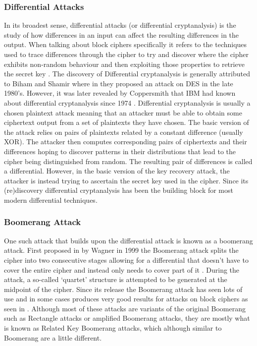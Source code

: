 \documentclass{article}
\begin{document}
\subsubsection{Differential Attacks}
In its broadest sense, differential attacks (or differential cryptanalysis) is the study of how differences in an input can affect the resulting differences in the output. When talking about block ciphers specifically it refers to the techniques used to trace differences through the cipher to try and discover where the cipher exhibits non-random behaviour and then exploiting those properties to retrieve the secret key \cite{wiki:Differential_cryptanalysis}. The discovery of Differential cryptanalysis is generally attributed to Biham and Shamir where in \cite{10.1007/3-540-38424-3_1} they proposed an attack on DES in the late 1980’s. However, it was later revealed by Coppersmith that IBM had known about differential cryptanalysis since 1974 \cite{5389567}. 
Differential cryptanalysis is usually a chosen plaintext attack meaning that an attacker must be able to obtain some ciphertext output from a set of plaintexts they have chosen. The basic version of the attack relies on pairs of plaintexts related by a constant difference (usually XOR). The attacker then computes corresponding pairs of ciphertexts and their differences hoping to discover patterns in their distributions that lead to the cipher being distinguished from random. The resulting pair of differences is called a differential. However, in the basic version of the key recovery attack, the attacker is instead trying to ascertain the secret key used in the cipher. Since its (re)discovery differential cryptanalysis has been the building block for most modern differential techniques.
\subsubsection{Boomerang Attack}
One such attack that builds upon the differential attack is known as a boomerang attack. First proposed in \cite{10.1007/3-540-48519-8_12} by Wagner in 1999 the Boomerang attack splits the cipher into two consecutive stages allowing for a differential that doesn’t have to cover the entire cipher and instead only needs to cover part of it \cite{wiki:Boomerang_attack}. During the attack, a so-called ‘quartet’ structure is attempted to be generated at the midpoint of the cipher. Since its release the Boomerang attack has seen lots of use and in some cases produces very good results for attacks on block ciphers as seen in \cite{AC:BirKho09} \cite{inproceedings} \cite{C:DunKelWei23}. Although most of these attacks are variants of the original Boomerang such as Rectangle attacks or amplified Boomerang attacks, they are mostly what is known as Related Key Boomerang attacks, which although similar to Boomerang are a little different.
\end{document}
